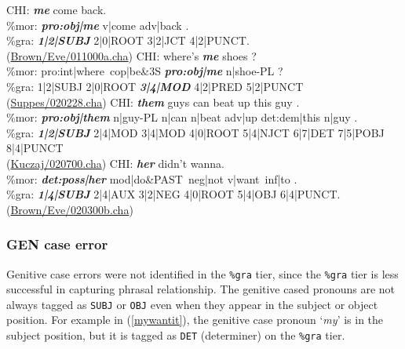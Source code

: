 \begin{exe}
\ex \label{666}\gll *CHI: \textit{\textbf{me}} come back.\\
\%mor: \textit{\textbf{pro:obj|me}} v|come adv|back .\\
\%gra: \textit{\textbf{1|2|SUBJ}} 2|0|ROOT 3|2|JCT 4|2|PUNCT. \\
(\href{https://childes.talkbank.org/browser/index.php?url=Eng-NA/Brown/Eve/011000a.cha}{Brown/Eve/011000a.cha})
\ex \label{meshoew} \gll *CHI:	where's \textbf{\textit{me}} shoes ?\\
\%mor:	pro:int|where~cop|be&3S \textit{\textbf{pro:obj|me}} n|shoe-PL ?\\
\%gra:	1|2|SUBJ 2|0|ROOT \textbf{\textit{3|4|MOD}} 4|2|PRED 5|2|PUNCT\\
(\href{https://childes.talkbank.org/browser/index.php?url=Eng-NA/Suppes/020228.cha}{Suppes/020228.cha})
\ex \label{them} \gll *CHI:	\textbf{\textit{them}} guys can beat up this guy .\\
\%mor:	\textit{\textbf{pro:obj|them}} n|guy-PL n|can n|beat adv|up det:dem|this n|guy .\\
\%gra:\textbf{\textit{	1|2|SUBJ} }2|4|MOD 3|4|MOD 4|0|ROOT 5|4|NJCT 6|7|DET 7|5|POBJ 8|4|PUNCT\\
(\href{https://childes.talkbank.org/browser/index.php?url=Eng-NA/Kuczaj/020700.cha}{Kuczaj/020700.cha})
\ex \label{herdidnt}\gll *CHI: \textit{\textbf{her}} didn't wanna.\\
\%mor: \textbf{\textit{det:poss|her}} mod|do&PAST~neg|not v|want~inf|to .\\
\%gra:	\textit{\textbf{1|4|SUBJ}} 2|4|AUX 3|2|NEG 4|0|ROOT 5|4|OBJ 6|4|PUNCT. \\
(\href{https://childes.talkbank.org/browser/index.php?url=Eng-NA/Brown/Eve/020300b.cha}{Brown/Eve/020300b.cha})
\end{exe}


\subsubsection{GEN case error}
Genitive case errors were not identified in the \texttt{\%gra} tier, since the \texttt{\%gra} tier is less successful in capturing phrasal relationship. The genitive cased pronouns are not always tagged as \texttt{SUBJ} or \texttt{OBJ} even when they appear in the subject or object position. For example in (\ref{mywantit}), the genitive case pronoun `\textit{my}' is in the subject position, but it is tagged as \texttt{DET} (determiner) on the \texttt{\%gra} tier. 

